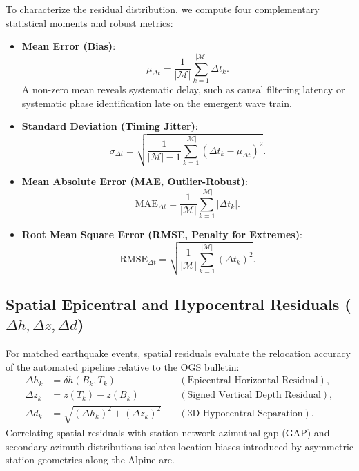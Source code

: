 To characterize the residual distribution, we compute four complementary statistical moments and robust metrics:
\begin{itemize}
  \item \textbf{Mean Error (Bias)}:
  \begin{equation}
    \mu_{\Delta t} = \frac{1}{|\mathcal{M}|} \sum_{k=1}^{|\mathcal{M}|} \Delta t_k.
  \end{equation}
  A non-zero mean reveals systematic delay, such as causal filtering latency or systematic phase identification late on the emergent wave train.
  \item \textbf{Standard Deviation (Timing Jitter)}:
  \begin{equation}
    \sigma_{\Delta t} = \sqrt{\frac{1}{|\mathcal{M}| - 1} \sum_{k=1}^{|\mathcal{M}|} (\Delta t_k - \mu_{\Delta t})^2}.
  \end{equation}
  \item \textbf{Mean Absolute Error (MAE, Outlier-Robust)}:
  \begin{equation}
    \mathrm{MAE}_{\Delta t} = \frac{1}{|\mathcal{M}|} \sum_{k=1}^{|\mathcal{M}|} |\Delta t_k|.
  \end{equation}
  \item \textbf{Root Mean Square Error (RMSE, Penalty for Extremes)}:
  \begin{equation}
    \mathrm{RMSE}_{\Delta t} = \sqrt{\frac{1}{|\mathcal{M}|} \sum_{k=1}^{|\mathcal{M}|} (\Delta t_k)^2}.
  \end{equation}
\end{itemize}

\subsection{Spatial Epicentral and Hypocentral Residuals ($\Delta h, \Delta z, \Delta d$)}
For matched earthquake events, spatial residuals evaluate the relocation accuracy of the automated pipeline relative to the OGS bulletin:
\begin{align}
  \Delta h_k &= \delta h(B_k, T_k) \quad &(\text{Epicentral Horizontal Residual}), \\
  \Delta z_k &= z(T_k) - z(B_k) \quad &(\text{Signed Vertical Depth Residual}), \\
  \Delta d_k &= \sqrt{(\Delta h_k)^2 + (\Delta z_k)^2} \quad &(\text{3D Hypocentral Separation}).
\end{align}
Correlating spatial residuals with station network azimuthal gap ($\mathrm{GAP}$) and secondary azimuth distributions isolates location biases introduced by asymmetric station geometries along the Alpine arc.

